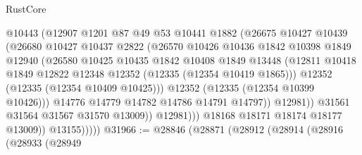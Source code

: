 \begin{lexlean}{RustCore}
\begin{coremodule}
                              @10443
                              (@12907
                                @1201
                                @87
                                @49
                                @53
                                @10441
                                @1882
                                (@26675
                                  @10427
                                  @10439
                                  (@26680
                                    @10427
                                    @10437
                                    @2822
                                    (@26570
                                      @10426
                                      @10436
                                      @1842
                                      @10398
                                      @1849
                                      @12940
                                      (@26580
                                        @10425
                                        @10435
                                        @1842
                                        @10408
                                        @1849
                                        @13448
                                        (@12811
                                          @10418
                                          @1849
                                          @12822
                                          @12348
                                          @12352
                                          (@12335 (@12354 @10419 @1865)))
                                        @12352
                                        (@12335 (@12354 @10409 @10425)))
                                      @12352
                                      (@12335 (@12354 @10399 @10426)))
                                    @14776
                                    @14779
                                    @14782
                                    @14786
                                    @14791
                                    @14797))
                                @12981))
                            @31561
                            @31564
                            @31567
                            @31570
                            @13009))
                        @12981)))
                  @18168
                  @18171
                  @18174
                  @18177
                  @13009))
              @13155)))))
@31966 := @28846
    (@28871
      (@28912
        (@28914
          (@28916
            (@28933
              (@28949

\end{coremodule}
\end{lexlean}
